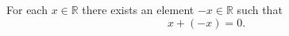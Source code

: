 For each $x \in \mathbb{R}$ there exists an element $-x \in \mathbb{R}$ such that
\begin{equation*}
x + (-x) = 0.
\end{equation*}
